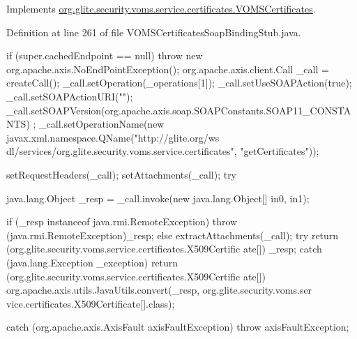 Implements \hyperlink{interfaceorg_1_1glite_1_1security_1_1voms_1_1service_1_1certificates_1_1VOMSCertificates_a043ddef1543bc48c39a8cd7efa2a48ed}{org.glite.security.voms.service.certificates.VOMSCertificates}.



Definition at line 261 of file VOMSCertificatesSoapBindingStub.java.


\begin{DoxyCode}
                                                                                 
                                                                                       
          {
        if (super.cachedEndpoint == null) {
            throw new org.apache.axis.NoEndPointException();
        }
        org.apache.axis.client.Call _call = createCall();
        _call.setOperation(_operations[1]);
        _call.setUseSOAPAction(true);
        _call.setSOAPActionURI("");
        _call.setSOAPVersion(org.apache.axis.soap.SOAPConstants.SOAP11_CONSTANTS)
      ;
        _call.setOperationName(new javax.xml.namespace.QName("http://glite.org/ws
      dl/services/org.glite.security.voms.service.certificates", "getCertificates"));

        setRequestHeaders(_call);
        setAttachments(_call);
 try {        java.lang.Object _resp = _call.invoke(new java.lang.Object[] {in0, 
      in1});

        if (_resp instanceof java.rmi.RemoteException) {
            throw (java.rmi.RemoteException)_resp;
        }
        else {
            extractAttachments(_call);
            try {
                return (org.glite.security.voms.service.certificates.X509Certific
      ate[]) _resp;
            } catch (java.lang.Exception _exception) {
                return (org.glite.security.voms.service.certificates.X509Certific
      ate[]) org.apache.axis.utils.JavaUtils.convert(_resp, org.glite.security.voms.ser
      vice.certificates.X509Certificate[].class);
            }
        }
  } catch (org.apache.axis.AxisFault axisFaultException) {
  throw axisFaultException;
}
    }
\end{DoxyCode}
